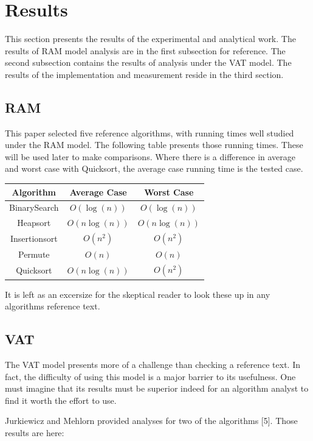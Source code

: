 \section{Results}

  This section presents the results of the experimental and analytical work.
  The results of RAM model analysis are in the first subsection for reference.
  The second subsection contains the results of analysis under the VAT model.
  The results of the implementation and measurement reside in the third
  section.

  \subsection{RAM}
    This paper selected five reference algorithms, with running times well 
    studied under the RAM model. The following table presents those running
    times. These will be used later to make comparisons. Where there is a
    difference in average and worst case with Quicksort, the average case
    running time is the tested case.
    
    \begin{tabular}{ccc}
      Algorithm     & Average Case  & Worst Case   \\\hline
      BinarySearch  & $O(\log(n))$  & $O(\log(n))$ \\
      Heapsort      & $O(n\log(n))$ & $O(n\log(n))$\\
      Insertionsort & $O(n^2)$      & $O(n^2)$     \\
      Permute       & $O(n)$        & $O(n)$       \\
      Quicksort     & $O(n\log(n))$ & $O(n^2)$     \\
    \end{tabular}
    
    It is left as an excersize for the skeptical reader to look these up in any
    algorithms reference text.

  \subsection{VAT}
    The VAT model presents more of a challenge than checking a reference text.
    In fact, the difficulty of using this model is a major barrier to its
    usefulness. One must imagine that its results must be superior indeed for
    an algorithm analyst to find it worth the effort to use.
    
    Jurkiewicz and Mehlorn provided analyses for two of the algorithms [5]. 
    Those results are here:
    
